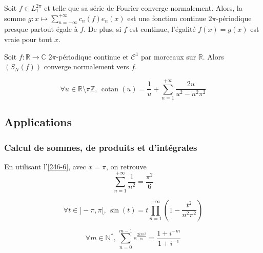 
	\begin{proposition}
		Soit $f \in L_1^{2\pi}$ et telle que sa série de Fourier converge normalement. Alors, la somme $g : x \mapsto \sum_{n=-\infty}^{+\infty} c_n(f) e_n(x)$ est une fonction continue $2\pi$-périodique presque partout égale à $f$. De plus, si $f$ est continue, l'égalité $f(x) = g(x)$ est vraie pour tout $x$.
	\end{proposition}

	\begin{proposition}
		Soit $f : \mathbb{R} \rightarrow \mathbb{C}$ $2\pi$-périodique continue et $\mathcal{C}^1$ par morceaux sur $\mathbb{R}$. Alors $(S_N(f))$ converge normalement vers $f$.
	\end{proposition}


	\begin{application}
		\[ \forall u \in \mathbb{R} \setminus \pi \mathbb{Z}, \, \operatorname{cotan}(u) = \frac{1}{u} + \sum_{n=1}^{+\infty} \frac{2u}{u^2 - n^2 \pi^2} \]
	\end{application}

	\subsection{Applications}

	\subsubsection{Calcul de sommes, de produits et d'intégrales}


	\begin{application}
		En utilisant l'\cref{246-6}, avec $x = \pi$, on retrouve
		\[ \sum_{n = 1}^{+\infty} \frac{1}{n^2} = \frac{\pi^2}{6} \]
	\end{application}

	\begin{application}
		\[ \forall t \in ]-\pi, \pi[, \, \sin(t) = t \prod_{n=1}^{+\infty} \left( 1 - \frac{t^2}{n^2\pi^2} \right) \]
	\end{application}


	\begin{application}
		\[ \forall m \in \mathbb{N}^*, \, \sum_{n=0}^{m-1} e^{\frac{2i\pi n^2}{m}} = \frac{1+i^{-m}}{1+i^{-1}} \]
	\end{application}

